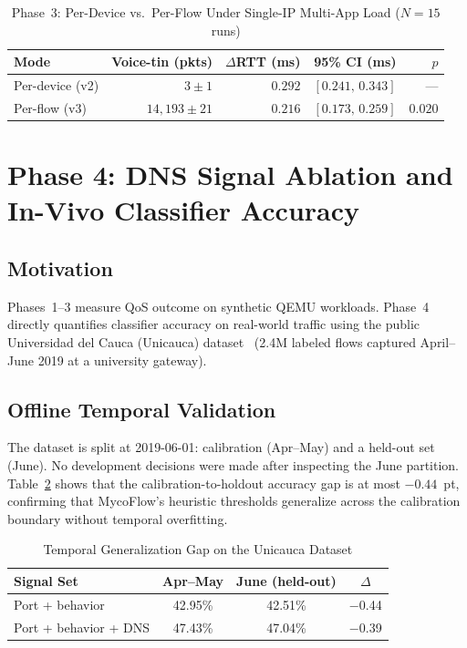 \begin{table}[h]
\centering
\caption{Phase~3: Per-Device vs.\ Per-Flow Under Single-IP Multi-App Load ($N{=}15$ runs)}
\label{tab:phase3}
\begin{tabular}{lrrrr}
\toprule
Mode & Voice-tin (pkts) & $\Delta$RTT (ms) & 95\% CI (ms) & $p$ \\
\midrule
Per-device (v2) & $3 \pm 1$         & $0.292$ & $[0.241,\,0.343]$ & --- \\
Per-flow   (v3) & $14{,}193 \pm 21$ & $0.216$ & $[0.173,\,0.259]$ & $0.020$ \\
\bottomrule
\end{tabular}
\end{table}

\section{Phase 4: DNS Signal Ablation and In-Vivo Classifier Accuracy}

\subsection{Motivation}

Phases~1--3 measure QoS outcome on synthetic QEMU workloads. Phase~4 directly quantifies classifier accuracy on real-world traffic using the public Universidad del Cauca (Unicauca) dataset~\cite{unicauca2019} (2.4M labeled flows captured April--June 2019 at a university gateway).

\subsection{Offline Temporal Validation}

The dataset is split at 2019-06-01: calibration (Apr--May) and a held-out set (June). No development decisions were made after inspecting the June partition. Table~\ref{tab:temporal} shows that the calibration-to-holdout accuracy gap is at most $-0.44$~pt, confirming that MycoFlow's heuristic thresholds generalize across the calibration boundary without temporal overfitting.

\begin{table}[h]
\caption{Temporal Generalization Gap on the Unicauca Dataset}
\label{tab:temporal}
\centering
\small
\begin{tabular}{l|cc|c}
\toprule
\textbf{Signal Set} & \textbf{Apr--May} & \textbf{June (held-out)} & $\Delta$ \\
\midrule
Port + behavior       & 42.95\% & 42.51\% & $-$0.44 \\
Port + behavior + DNS & 47.43\% & 47.04\% & $-$0.39 \\
\bottomrule
\end{tabular}
\end{table}

